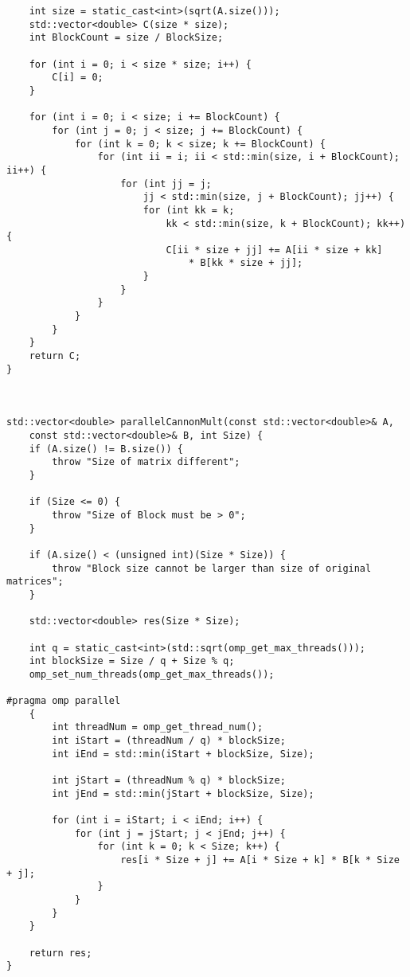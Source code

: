 \documentclass{report}
\begin{document}
\begin{lstlisting}
    int size = static_cast<int>(sqrt(A.size()));
    std::vector<double> C(size * size);
    int BlockCount = size / BlockSize;

    for (int i = 0; i < size * size; i++) {
        C[i] = 0;
    }

    for (int i = 0; i < size; i += BlockCount) {
        for (int j = 0; j < size; j += BlockCount) {
            for (int k = 0; k < size; k += BlockCount) {
                for (int ii = i; ii < std::min(size, i + BlockCount); ii++) {
                    for (int jj = j;
                        jj < std::min(size, j + BlockCount); jj++) {
                        for (int kk = k;
                            kk < std::min(size, k + BlockCount); kk++) {
                            C[ii * size + jj] += A[ii * size + kk]
                                * B[kk * size + jj];
                        }
                    }
                }
            }
        }
    }
    return C;
}



std::vector<double> parallelCannonMult(const std::vector<double>& A,
    const std::vector<double>& B, int Size) {
    if (A.size() != B.size()) {
        throw "Size of matrix different";
    }

    if (Size <= 0) {
        throw "Size of Block must be > 0";
    }

    if (A.size() < (unsigned int)(Size * Size)) {
        throw "Block size cannot be larger than size of original matrices";
    }

    std::vector<double> res(Size * Size);

    int q = static_cast<int>(std::sqrt(omp_get_max_threads()));
    int blockSize = Size / q + Size % q;
    omp_set_num_threads(omp_get_max_threads());
   
#pragma omp parallel
    {
        int threadNum = omp_get_thread_num();
        int iStart = (threadNum / q) * blockSize;
        int iEnd = std::min(iStart + blockSize, Size);

        int jStart = (threadNum % q) * blockSize;
        int jEnd = std::min(jStart + blockSize, Size);

        for (int i = iStart; i < iEnd; i++) {
            for (int j = jStart; j < jEnd; j++) {
                for (int k = 0; k < Size; k++) {
                    res[i * Size + j] += A[i * Size + k] * B[k * Size + j];
                }
            }
        }
    }

    return res;
}
\end{lstlisting}
\end{document}
